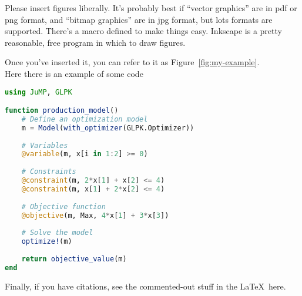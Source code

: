 \documentclass[12pt]{article}
\begin{document}
Please insert figures liberally.  It's probably best if ``vector graphics'' are in pdf or png format, and ``bitmap graphics'' are in jpg format, but lots formats are supported.  There's a macro defined to make things easy.  Inkscape is a pretty reasonable, free program in which to draw figures.
 

Once you've inserted it, you can refer to it as Figure~\ref{fig:my-example}.\\

Here there is an example of some code
\begin{lstlisting}[language=Julia]
using JuMP, GLPK

function production_model()
    # Define an optimization model
    m = Model(with_optimizer(GLPK.Optimizer))
    
    # Variables
    @variable(m, x[i in 1:2] >= 0)
    
    # Constraints
    @constraint(m, 2*x[1] + x[2] <= 4)
    @constraint(m, x[1] + 2*x[2] <= 4)
    
    # Objective function
    @objective(m, Max, 4*x[1] + 3*x[3])
    
    # Solve the model
    optimize!(m)
    
    return objective_value(m)
end
\end{lstlisting}
Finally, if you have citations, see the commented-out stuff in the \LaTeX~here.

\


%


\end{document}
